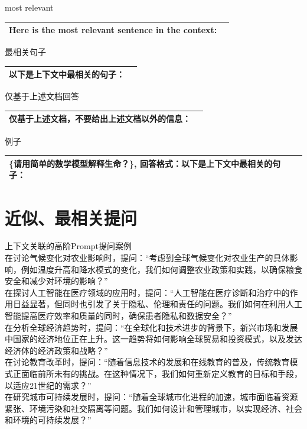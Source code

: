 \documentclass[12pt]{book}
\begin{document}
\bigskip
most relevant

\begin{tabular}{|p{15cm}|p{3cm}|}
	\hline
    Here is the most relevant sentence in the context:\\
	\hline
\end{tabular}



\bigskip
最相关句子

\begin{tabular}{|p{15cm}|p{3cm}|}
	\hline
以下是上下文中最相关的句子：\\
	\hline
\end{tabular}



\bigskip
仅基于上述文档回答

\begin{tabular}{|p{15cm}|p{3cm}|}
	\hline
仅基于上述文档，不要给出上述文档以外的信息：\\
	\hline
\end{tabular}


\bigskip
例子

\begin{tabular}{|p{15cm}|p{3cm}|}
	\hline
\{请用简单的数学模型解释生命？\},  回答格式：以下是上下文中最相关的句子：\\
	\hline
\end{tabular}

\section{近似、最相关提问}

上下文关联的高阶Prompt提问案例\\

在讨论气候变化对农业影响时，提问：“考虑到全球气候变化对农业生产的具体影响，例如温度升高和降水模式的变化，我们如何调整农业政策和实践，以确保粮食安全和减少对环境的影响？”\\
在探讨人工智能在医疗领域的应用时，提问：“人工智能在医疗诊断和治疗中的作用日益显著，但同时也引发了关于隐私、伦理和责任的问题。我们如何在利用人工智能提高医疗效率和质量的同时，确保患者隐私和数据安全？”\\
在分析全球经济趋势时，提问：“在全球化和技术进步的背景下，新兴市场和发展中国家的经济地位正在上升。这一趋势将如何影响全球贸易和投资模式，以及发达经济体的经济政策和战略？”\\
在讨论教育改革时，提问：“随着信息技术的发展和在线教育的普及，传统教育模式正面临前所未有的挑战。在这种情况下，我们如何重新定义教育的目标和手段，以适应21世纪的需求？”\\
在研究城市可持续发展时，提问：“随着全球城市化进程的加速，城市面临着资源紧张、环境污染和社交隔离等问题。我们如何设计和管理城市，以实现经济、社会和环境的可持续发展？”\\
\end{document}
